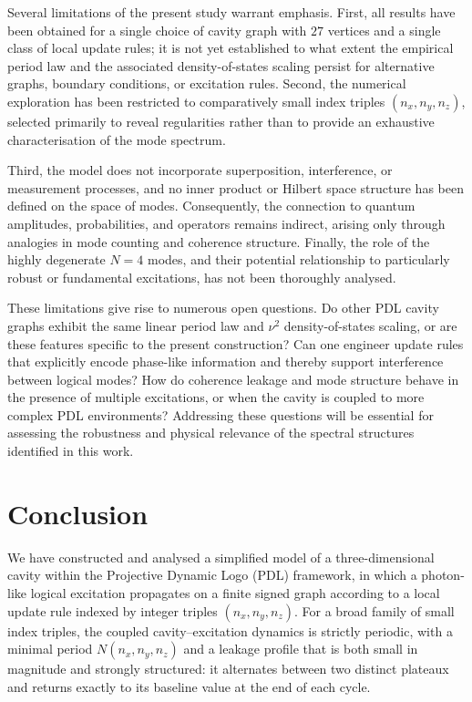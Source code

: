 \documentclass{article}
\theoremstyle{definition}
\begin{document}
Several limitations of the present study warrant emphasis. First, all results have been obtained for a single choice of cavity graph with $27$ vertices and a single class of local update rules; it is not yet established to what extent the empirical period law and the associated density-of-states scaling persist for alternative graphs, boundary conditions, or excitation rules.\cite{Effective_Fields_PDL_2026} Second, the numerical exploration has been restricted to comparatively small index triples $(n_x,n_y,n_z)$, selected primarily to reveal regularities rather than to provide an exhaustive characterisation of the mode spectrum.

Third, the model does not incorporate superposition, interference, or measurement processes, and no inner product or Hilbert space structure has been defined on the space of modes.\cite{PDL_Main_2026} Consequently, the connection to quantum amplitudes, probabilities, and operators remains indirect, arising only through analogies in mode counting and coherence structure. Finally, the role of the highly degenerate $N=4$ modes, and their potential relationship to particularly robust or fundamental excitations, has not been thoroughly analysed.

These limitations give rise to numerous open questions. Do other PDL cavity graphs exhibit the same linear period law and $\nu^2$ density-of-states scaling, or are these features specific to the present construction? Can one engineer update rules that explicitly encode phase-like information and thereby support interference between logical modes? How do coherence leakage and mode structure behave in the presence of multiple excitations, or when the cavity is coupled to more complex PDL environments? Addressing these questions will be essential for assessing the robustness and physical relevance of the spectral structures identified in this work.

\section{Conclusion}

We have constructed and analysed a simplified model of a three-dimensional cavity within the Projective Dynamic Logo (PDL) framework, in which a photon-like logical excitation propagates on a finite signed graph according to a local update rule indexed by integer triples $(n_x,n_y,n_z)$.\cite{PDL_Main_2026,Effective_Fields_PDL_2026} For a broad family of small index triples, the coupled cavity–excitation dynamics is strictly periodic, with a minimal period $N(n_x,n_y,n_z)$ and a leakage profile that is both small in magnitude and strongly structured: it alternates between two distinct plateaux and returns exactly to its baseline value at the end of each cycle.\cite{Effective_Fields_PDL_2026,Exponent_18_PDL_2026}
\end{document}
